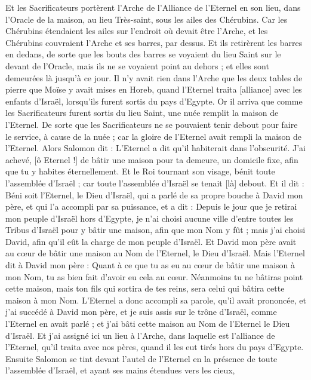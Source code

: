 \begin{multicols}{2}
Et les Sacrificateurs portèrent l'Arche de l'Alliance de l'Eternel en son lieu, dans l'Oracle de la maison, au lieu Très-saint, sous les ailes des Chérubins.
Car les Chérubins étendaient les ailes sur l'endroit où devait être l'Arche, et les Chérubins couvraient l'Arche et ses barres, par dessus.
Et ils retirèrent les barres en dedans, de sorte que les bouts des barres se voyaient du lieu Saint sur le devant de l'Oracle, mais ils ne se voyaient point au dehors ; et elles sont demeurées là jusqu'à ce jour.
Il n'y avait rien dans l'Arche que les deux tables de pierre que Moïse y avait mises en Horeb, quand l'Eternel traita [alliance] avec les enfants d'Israël, lorsqu'ils furent sortis du pays d'Egypte.
Or il arriva que comme les Sacrificateurs furent sortis du lieu Saint, une nuée remplit la maison de l'Eternel.
De sorte que les Sacrificateurs ne se pouvaient tenir debout pour faire le service, à cause de la nuée ; car la gloire de l'Eternel avait rempli la maison de l'Eternel.
Alors Salomon dit : L'Eternel a dit qu'il habiterait dans l'obscurité.
J'ai achevé, [ô Eternel !] de bâtir une maison pour ta demeure, un domicile fixe, afin que tu y habites éternellement.
Et le Roi tournant son visage, bénit toute l'assemblée d'Israël ; car toute l'assemblée d'Israël se tenait [là] debout.
Et il dit : Béni soit l'Eternel, le Dieu d'Israël, qui a parlé de sa propre bouche à David mon père, et qui l'a accompli par sa puissance, et a dit :
Depuis le jour que je retirai mon peuple d'Israël hors d'Egypte, je n'ai choisi aucune ville d'entre toutes les Tribus d'Israël pour y bâtir une maison, afin que mon Nom y fût ; mais j'ai choisi David, afin qu'il eût la charge de mon peuple d'Israël.
Et David mon père avait au cœur de bâtir une maison au Nom de l'Eternel, le Dieu d'Israël.
Mais l'Eternel dit à David mon père : Quant à ce que tu as eu au cœur de bâtir une maison à mon Nom, tu as bien fait d'avoir eu cela au cœur.
Néanmoins tu ne bâtiras point cette maison, mais ton fils qui sortira de tes reins, sera celui qui bâtira cette maison à mon Nom.
L'Eternel a donc accompli sa parole, qu'il avait prononcée, et j'ai succédé à David mon père, et je suis assis sur le trône d'Israël, comme l'Eternel en avait parlé ; et j'ai bâti cette maison au Nom de l'Eternel le Dieu d'Israël.
Et j'ai assigné ici un lieu à l'Arche, dans laquelle est l'alliance de l'Eternel, qu'il traita avec nos pères, quand il les eut tirés hors du pays d'Egypte.
Ensuite Salomon se tint devant l'autel de l'Eternel en la présence de toute l'assemblée d'Israël, et ayant ses mains étendues vers les cieux,

\end{multicols}
